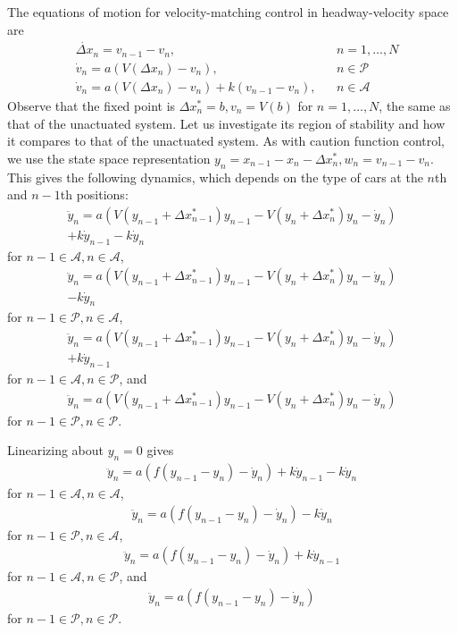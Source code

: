 \documentclass[10pt,twocolumn]{article}
\theoremstyle{ss}
\begin{document}
The equations of motion for velocity-matching control in headway-velocity space are
\begin{align}
&\dot{\Delta x}_n = v_{n-1} - v_n,& &n=1, \dots, N\\
&\dot{v}_n = a\left(V(\Delta x_n) - v_n \right),& &n \in \mathcal{P}\\
&\dot{v}_n = a\left(V(\Delta x_n) - v_n \right) + k(v_{n-1}-v_n),& &n \in \mathcal{A}
\end{align}
Observe that the fixed point is $\Delta x_n^* = b, v_n = V(b)$ for $n=1,\dots,N$, the same as that of the unactuated system. Let us investigate its region of stability and how it compares to that of the unactuated system. As with caution function control, we use the state space representation $y_n = x_{n-1} - x_n - \Delta x_n^*, w_n = v_{n-1} - v_n$. This gives the following dynamics, which depends on the type of cars at the $n$th and $n-1$th positions:
\begin{gather*}
\ddot{y}_n = a(V(y_{n-1} + \Delta x_{n-1}^*)y_{n-1} - V(y_n + \Delta x_{n}^*)y_n - \dot{y}_n) \\ + k\dot{y}_{n-1} - k\dot{y}_n
\end{gather*}
for $n-1 \in \mathcal{A}, n \in \mathcal{A}$,
\begin{gather*}
\ddot{y}_n = a(V(y_{n-1} + \Delta x_{n-1}^*)y_{n-1} - V(y_n + \Delta x_{n}^*)y_n - \dot{y}_n) \\ - k\dot{y}_n
\end{gather*}
for $n-1 \in \mathcal{P}, n \in \mathcal{A}$,
\begin{gather*}
\ddot{y}_n = a(V(y_{n-1} + \Delta x_{n-1}^*)y_{n-1} - V(y_n + \Delta x_{n}^*)y_n - \dot{y}_n) \\ + k\dot{y}_{n-1}
\end{gather*}
for $n-1 \in \mathcal{A}, n \in \mathcal{P}$, and
\begin{gather*}
\ddot{y}_n = a(V(y_{n-1} + \Delta x_{n-1}^*)y_{n-1} - V(y_n + \Delta x_{n}^*)y_n - \dot{y}_n)
\end{gather*}
for $n-1 \in \mathcal{P}, n \in \mathcal{P}$.


Linearizing about $y_n=0$ gives
\begin{gather*}
\ddot{y}_n = a(f(y_{n-1} - y_n) - \dot{y}_n) + k\dot{y}_{n-1} - k\dot{y}_n
\end{gather*}
for $n-1 \in \mathcal{A}, n \in \mathcal{A}$,
\begin{gather*}
\ddot{y}_n = a(f(y_{n-1} - y_n) - \dot{y}_n) - k\dot{y}_n
\end{gather*}
for $n-1 \in \mathcal{P}, n \in \mathcal{A}$,
\begin{gather*}
\ddot{y}_n = a(f(y_{n-1} - y_n) - \dot{y}_n) + k\dot{y}_{n-1}
\end{gather*}
for $n-1 \in \mathcal{A}, n \in \mathcal{P}$, and
\begin{gather*}
\ddot{y}_n = a(f(y_{n-1} - y_n) - \dot{y}_n)
\end{gather*}
for $n-1 \in \mathcal{P}, n \in \mathcal{P}$.
\end{document}
